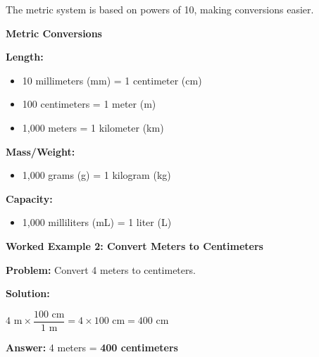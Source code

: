 \documentclass[12pt, letterpaper, fleqn]{article}
\begin{document}
\noindent
The metric system is based on powers of 10, making conversions easier.

\vspace{3mm}

\begin{tcolorbox}[colback=white, colframe=black!50, boxrule=0.6pt, arc=4mm, left=6mm, right=6mm, top=5mm, bottom=5mm]

\textbf{Metric Conversions}

\medskip

\noindent
\textbf{Length:}
\begin{itemize}
    \item 10 millimeters (mm) = 1 centimeter (cm)
    \item 100 centimeters = 1 meter (m)
    \item 1,000 meters = 1 kilometer (km)
\end{itemize}
\vspace{1cm}
\noindent
\textbf{Mass/Weight:}
\begin{itemize}
    \item 1,000 grams (g) = 1 kilogram (kg)
\end{itemize}
\vspace{1cm}
\noindent
\textbf{Capacity:}
\begin{itemize}
    \item 1,000 milliliters (mL) = 1 liter (L)
\end{itemize}

\end{tcolorbox}

\vspace{0.5cm}

\begin{tcolorbox}[colback=white, colframe=black!25, boxrule=0.6pt, arc=4mm, left=6mm, right=6mm, top=5mm, bottom=5mm]

\textbf{Worked Example 2: Convert Meters to Centimeters}

\medskip

\textbf{Problem:} Convert 4 meters to centimeters.

\medskip

\noindent

\vspace{1cm}
\textbf{Solution:}

\medskip

\noindent
$4 \text{ m} \times \dfrac{100 \text{ cm}}{1 \text{ m}} = 4 \times 100 \text{ cm} = 400 \text{ cm}$

\medskip
\vspace{1cm}
\noindent
\textbf{Answer:} 4 meters = \textbf{400 centimeters}

\end{tcolorbox}
\end{document}
